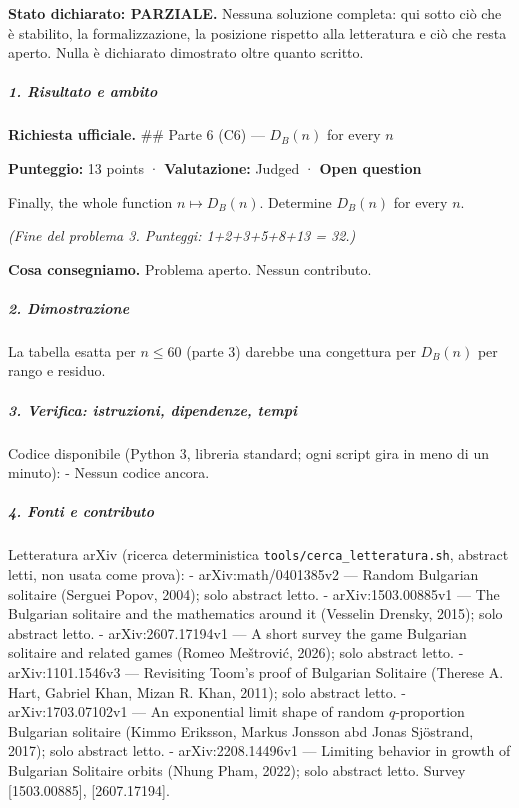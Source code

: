\documentclass[11pt,a4paper]{article}
\begin{document}
\textbf{Stato dichiarato: PARZIALE.} Nessuna soluzione completa: qui
sotto ciò che è stabilito, la formalizzazione, la posizione rispetto
alla letteratura e ciò che resta aperto. Nulla è dichiarato dimostrato
oltre quanto scritto.

\subparagraph{1. Risultato e ambito}\label{risultato-e-ambito}

\textbf{Richiesta ufficiale.} \#\# Parte 6 (C6) --- \(D_B(n)\) for every
\(n\)

\textbf{Punteggio:} 13 points · \textbf{Valutazione:} Judged ·
\textbf{Open question}

Finally, the whole function \(n \mapsto D_B(n)\). Determine \(D_B(n)\)
for every \(n\).

\emph{(Fine del problema 3. Punteggi: 1+2+3+5+8+13 = 32.)}

\textbf{Cosa consegniamo.} Problema aperto. Nessun contributo.

\subparagraph{2. Dimostrazione}\label{dimostrazione}

La tabella esatta per \(n\le60\) (parte 3) darebbe una congettura per
\(D_B(n)\) per rango e residuo.

\subparagraph{3. Verifica: istruzioni, dipendenze,
tempi}\label{verifica-istruzioni-dipendenze-tempi}

Codice disponibile (Python 3, libreria standard; ogni script gira in
meno di un minuto): - Nessun codice ancora.

\subparagraph{4. Fonti e contributo}\label{fonti-e-contributo}

Letteratura arXiv (ricerca deterministica
\texttt{tools/cerca\_letteratura.sh}, abstract letti, non usata come
prova): - arXiv:math/0401385v2 --- Random Bulgarian solitaire (Serguei
Popov, 2004); solo abstract letto. - arXiv:1503.00885v1 --- The
Bulgarian solitaire and the mathematics around it (Vesselin Drensky,
2015); solo abstract letto. - arXiv:2607.17194v1 --- A short survey the
game Bulgarian solitaire and related games (Romeo Meštrović, 2026); solo
abstract letto. - arXiv:1101.1546v3 --- Revisiting Toom's proof of
Bulgarian Solitaire (Therese A. Hart, Gabriel Khan, Mizan R. Khan,
2011); solo abstract letto. - arXiv:1703.07102v1 --- An exponential
limit shape of random \(q\)-proportion Bulgarian solitaire (Kimmo
Eriksson, Markus Jonsson abd Jonas Sjöstrand, 2017); solo abstract
letto. - arXiv:2208.14496v1 --- Limiting behavior in growth of Bulgarian
Solitaire orbits (Nhung Pham, 2022); solo abstract letto. Survey
{[}1503.00885{]}, {[}2607.17194{]}.
\end{document}
